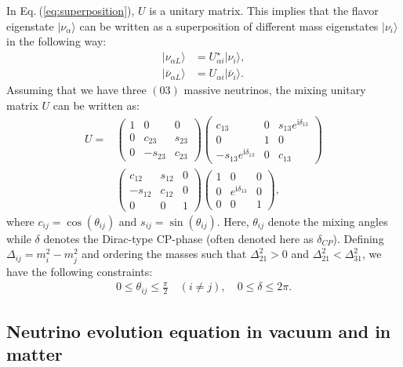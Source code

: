 \documentclass[twocolumn,secnumarabic,amssymb, nobibnotes, aps, prd,10pt]{revtex4-1}
\newcommand{\kt}[1]{\vert #1 \rangle}
\newcommand{\Eq}[1]{Eq.$\:$(\ref{#1})}
\begin{document}
In \Eq{eq:superposition}, $U$ is a unitary matrix. This implies that the flavor eigenstate
$\kt{\nu_\alpha}$ can be written as a superposition of different mass eigenstates $\kt{\nu_i}$
in the following way:
\begin{align}
\kt{\nu_{\alpha L}} &= U^\star_{\alpha i} \kt{\nu_i}, \\
\kt{\bar{\nu}_{\alpha L}} &= U_{\alpha i} \kt{\bar{\nu}_i}.
\end{align}
Assuming that we have three $(03)$ massive neutrinos, the mixing unitary matrix $U$ can 
be written as:
\begin{align}
U = & \left(\begin{array}{ccc}
1 & 0 & 0 \\
0 & c_{23} & s_{23} \\
0 & -s_{23} & c_{23}
\end{array}\right)\left(\begin{array}{ccc}
c_{13} & 0 & s_{13} e^{\mathrm{i} \delta_{13}} \\
0 & 1 & 0 \\
-s_{13} e^{\mathrm{i} \delta_{13}} & 0 & c_{13}
\end{array}\right) \nonumber \\
& \left(\begin{array}{ccc}
c_{12} & s_{12} & 0 \\
-s_{12} & c_{12} & 0 \\
0 & 0 & 1
\end{array}\right)\left(\begin{array}{ccc}
1 & 0 & 0 \\
0 & e^{ \mathrm{i} \delta_{13} } & 0 \\
0 & 0 & 1
\end{array}\right) ,
\label{eq:evolution_matrix}
\end{align}
where $c_{ij} = \cos(\theta_{ij})$ and $s_{ij} = \sin(\theta_{ij})$. Here, $\theta_{ij}$
denote the mixing angles while $\delta$ denotes the Dirac-type CP-phase (often denoted 
here as $\delta_{CP}$). Defining $\Delta_{ij} = m_i^2 - m_j^2$ and ordering the masses 
such that $\Delta_{21}^2 > 0$ and $\Delta_{21}^2 < \Delta_{31}^2$, we have the following 
constraints:
\begin{align}
0 \leq \theta_{ij} \leq \frac{\pi}{2} \quad (i \neq j), \quad 0 \leq \delta \leq 2 \pi .
\end{align}


\subsection{Neutrino evolution equation in vacuum and in matter}
\label{subsec:evoleq}
\end{document}
